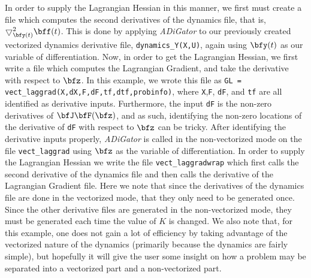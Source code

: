 \documentclass[10pt,pdftex]{article}
\begin{document}
In order to supply the Lagrangian Hessian in this manner, we first must create a file which computes the second derivatives of the dynamics file, that is, $\bigtriangledown^2_{\bfy(t)}\bff(t)$. This is done by applying \emph{ADiGator} to our previously created vectorized dynamics derivative file, \texttt{dynamics\_Y(X,U)}, again using $\bfy(t)$ as our variable of differentiation. Now, in order to get the Lagrangian Hessian, we first write a file which computes the Lagrangian Gradient, and take the derivative with respect to $\bfz$. In this example, we wrote this file as \texttt{GL = vect\_laggrad(X,dX,F,dF,tf,dtf,probinfo)}, where \texttt{X},\texttt{F}, \texttt{dF}, and \texttt{tf} are all identified as derivative inputs. Furthermore, the input \texttt{dF} is the non-zero derivatives of $\bfJ\bfF(\bfz)$, and as such, identifying the non-zero locations of the derivative of \texttt{dF} with respect to $\bfz$ can be tricky. After identifying the derivative inputs properly, \emph{ADiGator} is called in the non-vectorized mode on the file \texttt{vect\_laggrad} using $\bfz$ as the variable of differentiation. In order to supply the Lagrangian Hessian we write the file \texttt{vect\_laggradwrap} which first calls the second derivative of the dynamics file and then calls the derivative of the Lagrangian Gradient file. Here we note that since the derivatives of the dynamics file are done in the vectorized mode, that they only need to be generated once. Since the other derivative files are generated in the non-vectorized mode, they must be generated each time the value of $K$ is changed. We also note that, for this example, one does not gain a lot of efficiency by taking advantage of the vectorized nature of the dynamics (primarily because the dynamics are fairly simple), but hopefully it will give the user some insight on how a problem may be separated into a vectorized part and a non-vectorized part.
\end{document}
